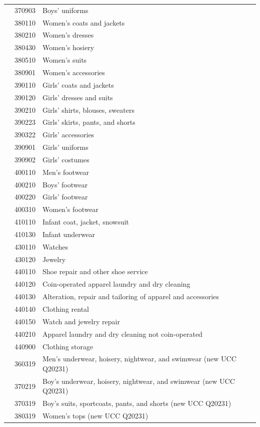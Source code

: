 \documentclass[
]{agujournal2019}
\begin{document}
\begin{table}
{\begin{tabular*}{\linewidth}{@{\extracolsep{\fill}}l|rl}
 & 370903 & Boys' uniforms \\ 
 & 380110 & Women's coats and jackets \\ 
 & 380210 & Women's dresses \\ 
 & 380430 & Women's hosiery \\ 
 & 380510 & Women's suits \\ 
 & 380901 & Women's accessories \\ 
 & 390110 & Girls' coats and jackets \\ 
 & 390120 & Girls' dresses and suits \\ 
 & 390210 & Girls' shirts, blouses, sweaters \\ 
 & 390223 & Girls' skirts, pants, and shorts \\ 
 & 390322 & Girls' accessories \\ 
 & 390901 & Girls' uniforms \\ 
 & 390902 & Girls' costumes \\ 
 & 400110 & Men's footwear \\ 
 & 400210 & Boys' footwear \\ 
 & 400220 & Girls' footwear \\ 
 & 400310 & Women's footwear \\ 
 & 410110 & Infant coat, jacket, snowsuit \\ 
 & 410130 & Infant underwear \\ 
 & 430110 & Watches \\ 
 & 430120 & Jewelry \\ 
 & 440110 & Shoe repair and other shoe service \\ 
 & 440120 & Coin-operated apparel laundry and dry cleaning \\ 
 & 440130 & Alteration, repair and tailoring of apparel and accessories \\ 
 & 440140 & Clothing rental \\ 
 & 440150 & Watch and jewelry repair \\ 
 & 440210 & Apparel laundry and dry cleaning not coin-operated \\ 
 & 440900 & Clothing storage \\ 
 & 360319 & Men's underwear, hoisery, nightwear, and swimwear (new UCC Q20231) \\ 
 & 370219 & Boy's underwear, hoisery, nightwear, and swimwear (new UCC Q20231) \\ 
 & 370319 & Boy's suits, sportcoats, pants, and shorts (new UCC Q20231) \\ 
 & 380319 & Women's tops (new UCC Q20231) \\ 

\end{tabular*}}
\end{table}
\end{document}
